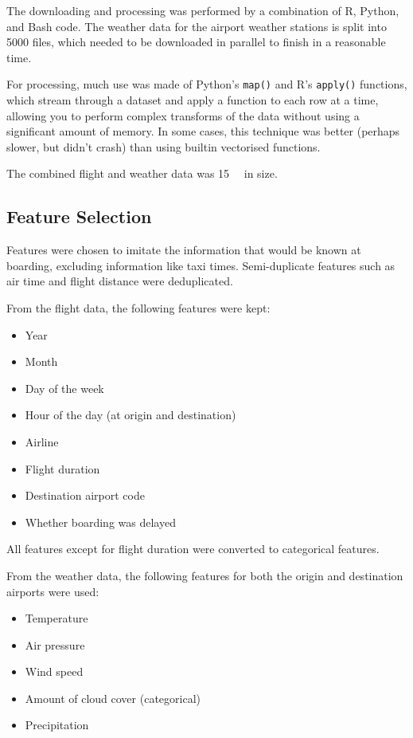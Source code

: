 \documentclass{article}
\begin{document}
The downloading and processing was performed by a combination of R, Python, and Bash code. The weather data for the airport weather stations is split into 5000 files, which needed to be downloaded in parallel to finish in a reasonable time.

For processing, much use was made of Python's \texttt{map()} and R's \texttt{apply()} functions, which stream through a dataset and apply a function to each row at a time, allowing you to perform complex transforms of the data without using a significant amount of memory. In some cases, this technique was better (perhaps slower, but didn't crash) than using builtin vectorised functions.

The combined flight and weather data was \SI{15}{\giga\byte} in size.

\subsection{Feature Selection}
Features were chosen to imitate the information that would be known at boarding, excluding information like taxi times. Semi-duplicate features such as air time and flight distance were deduplicated.

From the flight data, the following features were kept:
\begin{itemize}
    \item Year
    \item Month
    \item Day of the week
    \item Hour of the day (at origin and destination)
    \item Airline
    \item Flight duration
    \item Destination airport code
    \item Whether boarding was delayed
\end{itemize}
All features except for flight duration were converted to categorical features.

From the weather data, the following features for both the origin and destination airports were used:
\begin{itemize}
    \item Temperature
    \item Air pressure
    \item Wind speed
    \item Amount of cloud cover (categorical)
    \item Precipitation
\end{itemize}
\end{document}
